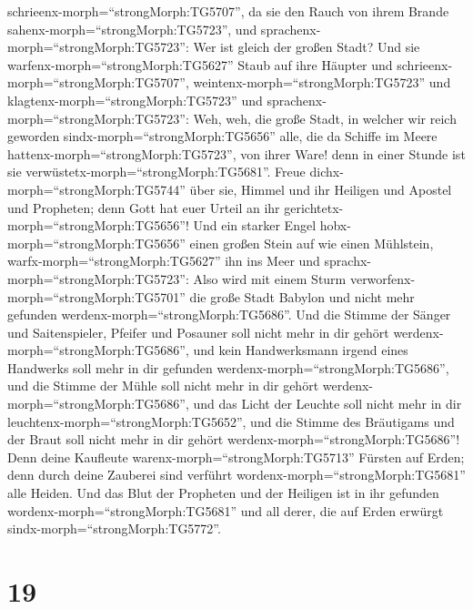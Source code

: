 schrieenx-morph=``strongMorph:TG5707'', da sie den Rauch von ihrem
Brande sahenx-morph=``strongMorph:TG5723'', und
sprachenx-morph=``strongMorph:TG5723'': Wer ist gleich der großen Stadt?
 Und sie warfenx-morph=``strongMorph:TG5627'' Staub auf
ihre Häupter und schrieenx-morph=``strongMorph:TG5707'',
weintenx-morph=``strongMorph:TG5723'' und
klagtenx-morph=``strongMorph:TG5723'' und
sprachenx-morph=``strongMorph:TG5723'': Weh, weh, die große Stadt, in
welcher wir reich geworden sindx-morph=``strongMorph:TG5656'' alle, die
da Schiffe im Meere hattenx-morph=``strongMorph:TG5723'', von ihrer
Ware! denn in einer Stunde ist sie
verwüstetx-morph=``strongMorph:TG5681''.  Freue
dichx-morph=``strongMorph:TG5744'' über sie, Himmel und ihr Heiligen und
Apostel und Propheten; denn Gott hat euer Urteil an ihr
gerichtetx-morph=``strongMorph:TG5656''!  Und ein starker
Engel hobx-morph=``strongMorph:TG5656'' einen großen Stein auf wie einen
Mühlstein, warfx-morph=``strongMorph:TG5627'' ihn ins Meer und
sprachx-morph=``strongMorph:TG5723'': Also wird mit einem Sturm
verworfenx-morph=``strongMorph:TG5701'' die große Stadt Babylon und
nicht mehr gefunden werdenx-morph=``strongMorph:TG5686''. 
Und die Stimme der Sänger und Saitenspieler, Pfeifer und Posauner soll
nicht mehr in dir gehört werdenx-morph=``strongMorph:TG5686'', und kein
Handwerksmann irgend eines Handwerks soll mehr in dir gefunden
werdenx-morph=``strongMorph:TG5686'', und die Stimme der Mühle soll
nicht mehr in dir gehört werdenx-morph=``strongMorph:TG5686'',
 und das Licht der Leuchte soll nicht mehr in dir
leuchtenx-morph=``strongMorph:TG5652'', und die Stimme des Bräutigams
und der Braut soll nicht mehr in dir gehört
werdenx-morph=``strongMorph:TG5686''! Denn deine Kaufleute
warenx-morph=``strongMorph:TG5713'' Fürsten auf Erden; denn durch deine
Zauberei sind verführt wordenx-morph=``strongMorph:TG5681'' alle Heiden.
 Und das Blut der Propheten und der Heiligen ist in ihr
gefunden wordenx-morph=``strongMorph:TG5681'' und all derer, die auf
Erden erwürgt sindx-morph=``strongMorph:TG5772''.

\hypertarget{section-18}{%
\section{19}\label{section-18}}

